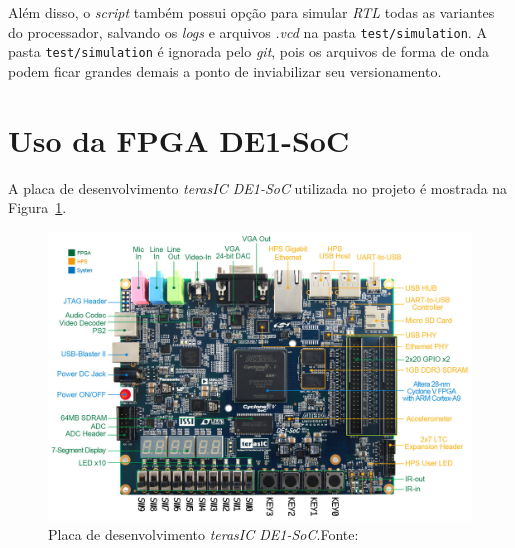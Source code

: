     { Além disso, o \textit{script} também possui opção para simular \textit{RTL}
        todas as variantes do processador, salvando os \textit{logs} e arquivos
        \textit{.vcd} na pasta \texttt{test/simulation}. A pasta \texttt{test/simulation}
        é ignorada pelo \textit{git}, pois os arquivos de forma de onda podem
        ficar grandes demais a ponto de inviabilizar seu versionamento.
    }

    \section{Uso da FPGA DE1-SoC}
    { A placa de desenvolvimento \textit{terasIC DE1-SoC} utilizada no projeto
        é mostrada na Figura~\ref{fig:de1_soc}.
    }

    \begin{figure}[H]
    \centering
        \includegraphics[width=.9\linewidth]{../images/fpga/de1_soc_subs.png}
        \caption[Placa de desenvolvimento \textit{terasIC DE1-SoC}.]{Placa de
        desenvolvimento \textit{terasIC DE1-SoC}.\quad Fonte:~\cite{terasic_de1_soc}}
        \label{fig:de1_soc}
    \end{figure}


